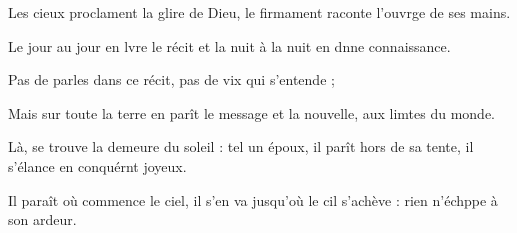 \item Les cieux proclament la glire de Dieu,\psstar{} le firmament raconte l’ouvrge de ses mains.
\item Le jour au jour en lvre le récit\psstar{} et la nuit à la nuit en dnne connaissance.
\item Pas de parles dans ce récit,\psstar{} pas de vix qui s’entende ;
\item Mais sur toute la terre en parît le message\psstar{} et la nouvelle, aux limtes du monde. 
\item Là, se trouve la demeure du soleil :\pscross{} tel un époux, il parît hors de sa tente,\psstar{} il s’élance en conquérnt joyeux.
\item Il paraît où commence le ciel,\pscross{} il s’en va jusqu’où le cil s’achève :\psstar{} rien n’échppe à son ardeur.